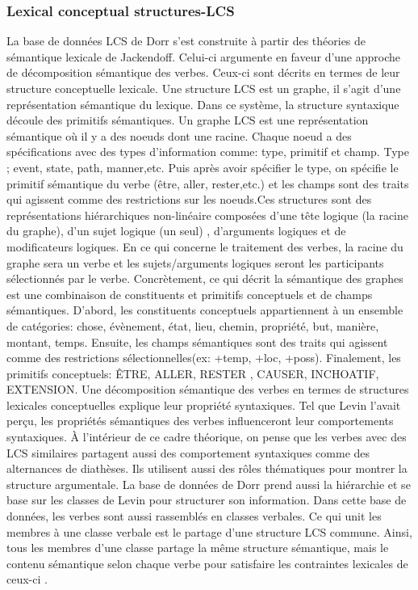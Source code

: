 \subsubsection{Lexical conceptual structures-LCS}
La base de données LCS de Dorr s'est construite à partir des théories de sémantique lexicale de Jackendoff. Celui-ci argumente en faveur d'une approche de décomposition sémantique des verbes. Ceux-ci sont décrits en termes de leur structure conceptuelle lexicale\citep{DorrUseLexicalSemantics1992}. Une structure LCS est un graphe, il s'agit d'une représentation sémantique du lexique. Dans ce système, la structure syntaxique découle des primitifs sémantiques. Un graphe LCS est une représentation sémantique où il y a des noeuds dont une racine. Chaque noeud a des spécifications avec des types d'information comme: type, primitif et champ. Type ; event, state, path, manner,etc. Puis après avoir spécifier le type, on spécifie le primitif sémantique du verbe (être, aller, rester,etc.)  et les champs sont des traits qui agissent comme des restrictions sur les noeuds.Ces structures sont des représentations hiérarchiques non-linéaire composées d'une tête logique (la racine du graphe), d'un sujet logique (un seul) , d'arguments logiques et de modificateurs logiques. En ce qui concerne le traitement des verbes, la racine du graphe sera un verbe et les sujets/arguments logiques seront les participants sélectionnés par le verbe. Concrètement, ce qui décrit la sémantique des graphes est une combinaison de constituents et primitifs conceptuels et de champs sémantiques. D'abord, les constituents conceptuels appartiennent à un ensemble de catégories: chose, évènement, état, lieu, chemin, propriété, but, manière, montant, temps. Ensuite, les champs sémantiques sont des traits qui agissent comme des restrictions sélectionnelles(ex: +temp, +loc, +poss). Finalement, les primitifs conceptuels: ÊTRE, ALLER, RESTER , CAUSER, INCHOATIF, EXTENSION. Une décomposition sémantique des verbes en termes de structures lexicales conceptuelles explique leur propriété syntaxiques. Tel que Levin l'avait perçu, les propriétés sémantiques des verbes influenceront leur comportements syntaxiques. À l'intérieur de ce cadre théorique, on pense que les verbes avec des LCS similaires partagent aussi des comportement syntaxiques comme des alternances de diathèses. Ils utilisent aussi des rôles thématiques pour montrer la structure argumentale. La base de données de Dorr prend aussi la hiérarchie et se base sur les classes de Levin pour structurer son information. Dans cette base de données, les verbes sont aussi rassemblés en classes verbales. Ce qui unit les membres à une classe verbale est le partage d'une structure LCS commune. Ainsi, tous les membres d'une classe partage la même structure sémantique, mais le contenu sémantique selon chaque verbe pour satisfaire les contraintes lexicales de ceux-ci \citep{TraumGenerationLexicalConceptual2000}. 

